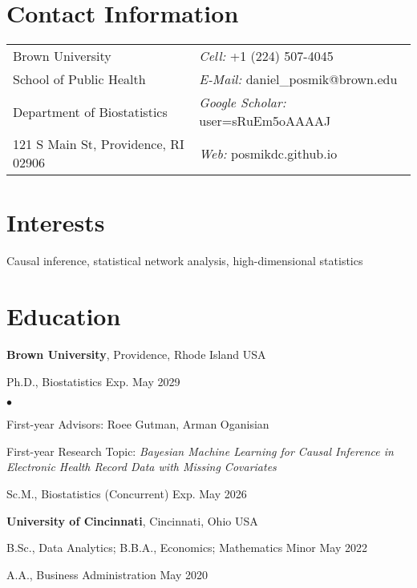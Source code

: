 \documentclass[margin,line]{res}
\newenvironment{list1}{
  \begin{list}{\ding{113}}{%
      \setlength{\itemsep}{0in}
      \setlength{\parsep}{0in} \setlength{\parskip}{0in}
      \setlength{\topsep}{0in} \setlength{\partopsep}{0in} 
      \setlength{\leftmargin}{0.17in}}}{\end{list}}
\newenvironment{list2}{
  \begin{list}{$\bullet$}{%
      \setlength{\itemsep}{0in}
      \setlength{\parsep}{0in} \setlength{\parskip}{0in}
      \setlength{\topsep}{0in} \setlength{\partopsep}{0in} 
      \setlength{\leftmargin}{0.2in}}}{\end{list}}
\begin{document}

\begin{resume}
\section{\sc Contact Information}
\vspace{.05in}
\begin{tabular}{@{}p{3in}p{4in}}
Brown University & {\it Cell:} +1 (224) 507-4045 \\            
School of Public Health & {\it E-Mail:} {daniel\_posmik@brown.edu} \\    
Department of Biostatistics & {\it Google Scholar:} user=sRuEm5oAAAAJ \\
121 S Main St, Providence, RI 02906 & {\it Web:} posmikdc.github.io \\       
\end{tabular}


\section{\sc Interests}
Causal inference, statistical network analysis, high-dimensional statistics

\section{\sc Education}
{\bf Brown University}, Providence, Rhode Island USA\\
\vspace*{-.1in}
\begin{list1}
  \item[] Ph.D., Biostatistics \hfill Exp. May 2029

\begin{list2}
\vspace*{.05in}
\item First-year Advisors: Roee Gutman, Arman Oganisian
\item First-year Research Topic: {\em Bayesian Machine Learning for Causal Inference in Electronic Health Record Data with Missing Covariates}
\end{list2}
\vspace*{.05in}
\item[] Sc.M., Biostatistics (Concurrent) \hfill Exp. May 2026
\end{list1}

{\bf University of Cincinnati}, Cincinnati, Ohio USA\\
\vspace*{-.1in}
\begin{list1}
\item[] B.Sc., Data Analytics; B.B.A., Economics; Mathematics Minor \hfill May 2022
\item[] A.A., Business Administration \hfill May 2020
\end{list1}



\end{resume}
\end{document}
